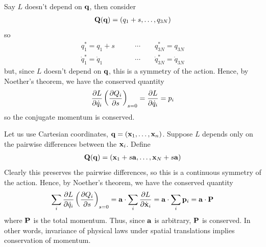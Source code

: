\documentclass{../template/note}
\begin{document}
    \begin{example*}
        Say $L$ doesn't depend on $\V q$, then consider
        \begin{align*}
            \V Q(\V q) = (q_1 + s, \dots, q_{3N})
        \end{align*}
        so
        \begin{align*}
            q_1^* = q_1 + s \qquad &\cdots \qquad q_{3N}^* = q_{3N} \\
            \dot q_1^* = \dot q_1 \qquad &\cdots \qquad \dot q_{3N}^* = \dot q_{3N}
        \end{align*}
        but, since $L$ doesn't depend on $\V q$, this is a symmetry of the action. Hence, by Noether's theorem, we have the conserved quantity
        \begin{align*}
            \pd{L}{\dot q_i} \left(\pd{Q_i}{s}\right)_{s=0} = \pd{L}{\dot q_i} = p_i
        \end{align*}
        so the conjugate momentum is conserved.       
    \end{example*}
    

    \begin{example*}
        Let us use Cartesian coordinates, $\V q = (\V x_1, \dots, \V x_n)$. Suppose $L$ depends only on the pairwise differences between the $\V x_i$. Define
        \begin{align*}
            \V Q(\V q) = (\V x_1 + s \V a, \dots, \V x_N + s \V a)
        \end{align*}
        Clearly this preserves the pairwise differences, so this is a continuous symmetry of the action. Hence, by Noether's theorem, we have the conserved quantity
        \begin{align*}
            \sum_i \pd{L}{\dot q_i} \left(\pd{Q_i}{s}\right)_{s=0} = \V a \cdot \sum_i \pd{L}{\dot{\V x}_i} = \V a \cdot \sum_i \V p_i = \V a \cdot \V P
        \end{align*}
        where $\V P$ is the total momentum. Thus, since $\V a$ is arbitrary, $\V P$ is conserved. In other words, invariance of physical laws under spatial translations implies conservation of momentum.       
    \end{example*}
    
\end{document}
